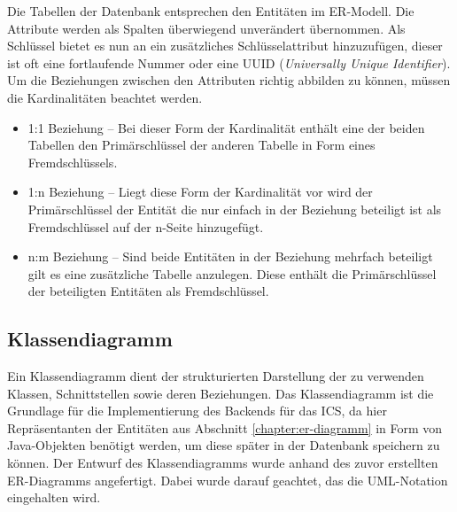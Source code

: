 		Die Tabellen der Datenbank entsprechen den Entitäten im ER-Modell. Die Attribute werden als Spalten überwiegend unverändert übernommen. Als Schlüssel bietet es nun an ein zusätzliches Schlüsselattribut hinzuzufügen, dieser ist oft eine fortlaufende Nummer oder eine UUID (\textit{Universally Unique Identifier}). Um die Beziehungen zwischen den Attributen richtig abbilden zu können, müssen die Kardinalitäten beachtet werden. 
		\begin{itemize}
			\item 1:1 Beziehung -- Bei dieser Form der Kardinalität enthält eine der beiden Tabellen den Primärschlüssel der anderen Tabelle in Form eines Fremdschlüssels.
			\item 1:n Beziehung -- Liegt diese Form der Kardinalität vor wird der Primärschlüssel der Entität die nur einfach in der Beziehung beteiligt ist als Fremdschlüssel auf der n-Seite hinzugefügt. 
			\item n:m Beziehung -- Sind beide Entitäten in der Beziehung mehrfach beteiligt gilt es eine zusätzliche Tabelle anzulegen. Diese enthält die Primärschlüssel der beteiligten Entitäten als Fremdschlüssel.
		\end{itemize}
		
		\subsection{Klassendiagramm}
		Ein Klassendiagramm dient der strukturierten Darstellung der zu verwenden Klassen, Schnittstellen sowie deren Beziehungen. Das Klassendiagramm ist die Grundlage für die Implementierung des Backends für das \ac{ICS}, da hier Repräsentanten der Entitäten aus Abschnitt \ref{chapter:er-diagramm} in Form von Java-Objekten benötigt werden, um diese später in der Datenbank speichern zu können. Der Entwurf des Klassendiagramms wurde anhand des zuvor erstellten ER-Diagramms angefertigt. Dabei wurde darauf geachtet, das die UML-Notation eingehalten wird.
		
